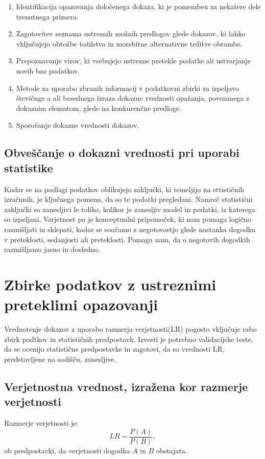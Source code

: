 \documentclass[a4paper,12pt]{article}
\begin{document}
\begin{enumerate}
   \item Identifikacija opazovanja določenega dokaza, ki je pomemben za nekatere dele trenutnega primera.
   \item Zagotovitev seznama ustreznih možnih predlogov glede dokazov, ki lahko vključujejo obtožbe tožilstva in morebitne 
         alternativne trditve obrambe.
   \item Prepoznavanje virov, ki vsebujejo ustrezne pretekle podatke ali ustvarjanje novih baz podatkov.
   \item Metode za uporabo zbranih informacij v podatkovni zbirki za izpeljavo števičnge a ali besednega izraza dokazne 
         vrednosti opažanja, povezanega z dokaznim elemntom, glede na konkurenčne predloge.
   \item Sporočanje dokazne vrednosti dokazov.
\end{enumerate}

\subsection{Obveščanje o dokazni vrednosti pri uporabi statistike}
Kadar se na podlagi podatkov oblikujejo zaključki, ki temeljijo na sttističnih izračunih, je ključnega pomena, da so te podatki 
pregledani. Namreč statistični zaključki so zanesljivi le toliko, kolikor je zanesljiv model in podatki, iz katerega so 
izpeljani. Verjetnost pa je konceptualni pripomoček, ki nam pomaga logično razmišljati in sklepati, kadar se soočamo z negotovostjo 
glede nastanka dogodka v preteklosti, sedanjosti ali preteklosti. Pomaga nam, da o negotovih dogodkih razmišljamo jasno in dosledno.

\section{Zbirke podatkov z ustreznimi preteklimi opazovanji}
Vrednotenje dokazov z uporabo razmerja verjetnosti(LR) pogosto vključuje rabo zbirk podtkov in statističnih predpostavk. Izvesti je 
potrebno validacijske teste, da se ocenijo statistične predpostavke in zagotovi, da so vrednosti LR, predstavljene na sodišču, 
zanesljive.

\subsection{Verjetnostna vrednost, izražena kor razmerje verjetnosti}
Razmerje verjetnosti je:
\[ LR = \frac{P(A)}{P(B)},\]
ob predpostavki, da verjetnosti dogodka $A$ in $B$ obstajata. \\ \\
\end{document}
